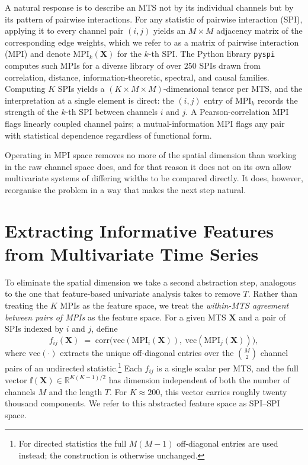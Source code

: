\documentclass{article}
\theoremstyle{plain}
\theoremstyle{definition}
\theoremstyle{remark}
\begin{document}
A natural response is to describe an MTS not by its individual channels but by its pattern of pairwise interactions. For any statistic of pairwise interaction (SPI), applying it to every channel pair $(i,j)$ yields an $M \times M$ adjacency matrix of the corresponding edge weights, which we refer to as a matrix of pairwise interaction (MPI) and denote $\mathrm{MPI}_k(\mathbf{X})$ for the $k$-th SPI. The Python library \texttt{pyspi} \cite{} computes such MPIs for a diverse library of over $250$ SPIs drawn from correlation, distance, information-theoretic, spectral, and causal families. Computing $K$ SPIs yields a $(K \times M \times M)$-dimensional tensor per MTS, and the interpretation at a single element is direct: the $(i,j)$ entry of $\mathrm{MPI}_k$ records the strength of the $k$-th SPI between channels $i$ and $j$. A Pearson-correlation MPI flags linearly coupled channel pairs; a mutual-information MPI flags any pair with statistical dependence regardless of functional form.

Operating in MPI space removes no more of the spatial dimension than working in the raw channel space does, and for that reason it does not on its own allow multivariate systems of differing widths to be compared directly. It does, however, reorganise the problem in a way that makes the next step natural.

\section{Extracting Informative Features from Multivariate Time Series}
\label{sec:extract}

To eliminate the spatial dimension we take a second abstraction step, analogous to the one that feature-based univariate analysis takes to remove $T$. Rather than treating the $K$ MPIs as the feature space, we treat the \emph{within-MTS agreement between pairs of MPIs} as the feature space. For a given MTS $\mathbf{X}$ and a pair of SPIs indexed by $i$ and $j$, define
\begin{equation}
f_{ij}(\mathbf{X}) \;=\; \mathrm{corr}\!\Big(\mathrm{vec}(\mathrm{MPI}_i(\mathbf{X})),\ \mathrm{vec}(\mathrm{MPI}_j(\mathbf{X}))\Big),
\label{eq:fij}
\end{equation}
where $\mathrm{vec}(\cdot)$ extracts the unique off-diagonal entries over the $\binom{M}{2}$ channel pairs of an undirected statistic.\footnote{For directed statistics the full $M(M-1)$ off-diagonal entries are used instead; the construction is otherwise unchanged.} Each $f_{ij}$ is a single scalar per MTS, and the full vector $\mathbf{f}(\mathbf{X}) \in \mathbb{R}^{K(K-1)/2}$ has dimension independent of both the number of channels $M$ and the length $T$. For $K \approx 200$, this vector carries roughly twenty thousand components. We refer to this abstracted feature space as SPI--SPI space.
\end{document}
